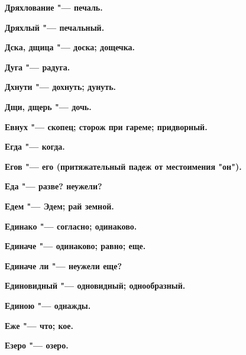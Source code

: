 \bfseries Дряхлование \normalfont{} "--- печаль. 




\bfseries Дряхлый \normalfont{} "--- печальный. 




\bfseries Дска, дщица \normalfont{} "--- доска; дощечка. 




\bfseries Дуга \normalfont{} "--- радуга. 




\bfseries Дхнути \normalfont{} "--- дохнуть; дунуть. 




\bfseries Дщи, дщерь \normalfont{} "--- дочь. 




 





\bfseries Евнух \normalfont{} "--- скопец; сторож при гареме; придворный. 




\bfseries Егда \normalfont{} "--- когда. 




\bfseries Егов \normalfont{} "--- его (притяжательный падеж от местоимения "он"). 




\bfseries Еда \normalfont{} "--- разве? неужели? 




\bfseries Едем \normalfont{} "--- Эдем; рай земной. 




\bfseries Единако \normalfont{} "--- согласно; одинаково. 




\bfseries Единаче \normalfont{} "--- одинаково; равно; еще. 




\bfseries Единаче ли \normalfont{} "--- неужели еще? 




\bfseries Единовидный \normalfont{} "--- одновидный; однообразный. 




\bfseries Единою \normalfont{} "--- однажды. 




\bfseries Еже \normalfont{} "--- что; кое. 




\bfseries Езеро \normalfont{} "--- озеро. 




